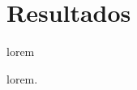 \section{Resultados}

\begin{frame}{lorem}
    \begin{block}{lorem.}

    \end{block}


\end{frame}
